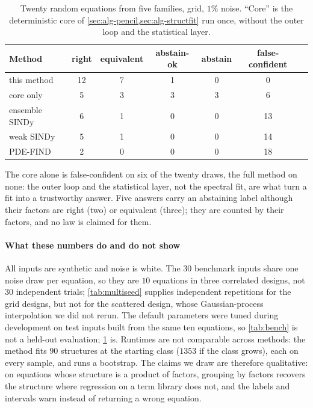 \documentclass[11pt]{article}
\theoremstyle{plain}
\theoremstyle{definition}
\theoremstyle{remark}
\begin{document}
\begin{table}[tbp]
\centering\small
\caption{Twenty random equations from five families, grid, $1\%$ noise. ``Core'' is the deterministic core of
\cref{sec:alg-pencil,sec:alg-structfit} run once, without the outer loop and the statistical layer.}\label{tab:e13}
\begin{tabular}{@{}lcccccc@{}}
\toprule
Method & right & equivalent & abstain-ok & abstain & false-confident\\
\midrule
this method    & 12 & 7 & 1 & 0 & \phantom{1}0\\
core only      & \phantom{1}5 & 3 & 3 & 3 & \phantom{1}6\\
ensemble SINDy & \phantom{1}6 & 1 & 0 & 0 & 13\\
weak SINDy     & \phantom{1}5 & 1 & 0 & 0 & 14\\
PDE-FIND       & \phantom{1}2 & 0 & 0 & 0 & 18\\
\bottomrule
\end{tabular}
\end{table}

The core alone is false-confident on six of the twenty draws, the full method on none: the outer loop and
the statistical layer, not the spectral fit, are what turn a fit into a trustworthy answer. Five answers carry an abstaining label although their factors are right (two) or equivalent (three); they are
counted by their factors, and no law is claimed for them.

\paragraph{What these numbers do and do not show} All inputs are synthetic and noise is white. The $30$
benchmark inputs share one noise draw per equation, so they are $10$ equations in three correlated
designs, not $30$ independent trials; \cref{tab:multiseed} supplies independent repetitions for the grid designs, but
not for the scattered design, whose Gaussian-process interpolation we did not rerun. The default parameters were tuned during
development on test inputs built from the same ten equations, so \cref{tab:bench} is not a held-out
evaluation; \cref{tab:e13} is. Runtimes are not comparable across methods: the
method fits $90$ structures at the starting class ($1353$ if the class grows), each on every sample, and runs a bootstrap. The claims we draw are
therefore qualitative: on equations whose structure is a product of factors, grouping by factors recovers
the structure where regression on a term library does not, and the labels and intervals warn instead of
returning a wrong equation.
\end{document}
